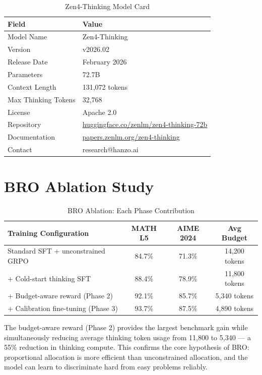 \documentclass[11pt,a4paper]{article}
\begin{document}
\begin{table}[H]
\centering
\begin{tabular}{ll}
\toprule
\textbf{Field} & \textbf{Value} \\
\midrule
Model Name         & Zen4-Thinking \\
Version            & v2026.02 \\
Release Date       & February 2026 \\
Parameters         & 72.7B \\
Context Length     & 131,072 tokens \\
Max Thinking Tokens& 32,768 \\
License            & Apache 2.0 \\
Repository         & \href{https://huggingface.co/zenlm/zen4-thinking-72b}{huggingface.co/zenlm/zen4-thinking-72b} \\
Documentation      & \href{https://papers.zenlm.org/zen4-thinking}{papers.zenlm.org/zen4-thinking} \\
Contact            & research@hanzo.ai \\
\bottomrule
\end{tabular}
\caption{Zen4-Thinking Model Card}
\end{table}

\section{BRO Ablation Study}

\begin{table}[H]
\centering
\begin{tabular}{lccc}
\toprule
\textbf{Training Configuration} & \textbf{MATH L5} & \textbf{AIME 2024} & \textbf{Avg Budget} \\
\midrule
Standard SFT + unconstrained GRPO  & 84.7\% & 71.3\% & 14,200 tokens \\
+ Cold-start thinking SFT          & 88.4\% & 78.9\% & 11,800 tokens \\
+ Budget-aware reward (Phase 2)    & 92.1\% & 85.7\% & 5,340 tokens \\
+ Calibration fine-tuning (Phase 3)& 93.7\% & 87.5\% & 4,890 tokens \\
\bottomrule
\end{tabular}
\caption{BRO Ablation: Each Phase Contribution}
\end{table}

The budget-aware reward (Phase 2) provides the largest benchmark gain while simultaneously
reducing average thinking token usage from 11,800 to 5,340 --- a 55\% reduction in thinking
compute. This confirms the core hypothesis of BRO: proportional allocation is more efficient
than unconstrained allocation, and the model can learn to discriminate hard from easy
problems reliably.
\end{document}
